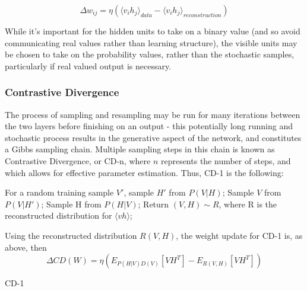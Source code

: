 \documentclass[a4paper,latin]{paper}
\begin{document}
\begin{equation}
\Delta w_{ij} = \eta (\langle v_ih_j\rangle_{data} - \langle v_ih_j\rangle_{reconstruction})
\end{equation}

While it's important for the hidden units to take on a binary value (and so avoid communicating real values rather than learning structure), the visible units may be chosen to take on the probability values, rather than the stochastic samples, particularly if real valued output is necessary. 

\subsubsection{Contrastive Divergence}\label{imp_CD}

The process of sampling and resampling may be run for many iterations between the two layers before finishing on an output - this potentially long running and stochastic process results in the generative aspect of the network, and constitutes a Gibbs sampling chain. Multiple sampling steps in this chain is known as Contrastive Divergence, or CD-n, where $n$ represents the number of steps, and which allows for effective parameter estimation. Thus, CD-1 is the following:\newline


\begin{algorithm}[H]
	
	\texttt{}\newline
	
	For a random training sample $V'$, sample $H'$ from $P(V|H)$;\newline
	Sample $V$ from $P(V|H')$;\newline
	Sample H from $P(H|V)$;\newline
	Return $(V,H) \sim R $, where R is the reconstructed distribution for $\langle vh \rangle$;\newline
	
	Using the reconstructed distribution $R(V,H)$, the weight update for CD-1 is, as above, then 
	\begin{equation}
	\Delta CD(W) = \eta( E_{P(H|V)D(V)}[VH^T] - E_{R(V,H)}[VH^T])
	\end{equation}
	
	
	
	\label{algo_cd1}
	\caption{CD-1}
\end{algorithm}
\end{document}
